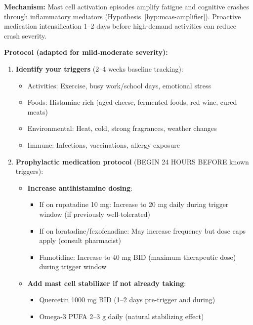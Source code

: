\begin{recommendation}
\label{rec:mcas-prophylaxis-mild-moderate}

\textbf{Mechanism:} Mast cell activation episodes amplify fatigue and cognitive crashes through inflammatory mediators (Hypothesis~\ref{hyp:mcas-amplifier}). Proactive medication intensification 1--2 days before high-demand activities can reduce crash severity.

\textbf{Protocol (adapted for mild-moderate severity):}

\begin{enumerate}
    \item \textbf{Identify your triggers} (2--4 weeks baseline tracking):
    \begin{itemize}
        \item Activities: Exercise, busy work/school days, emotional stress
        \item Foods: Histamine-rich (aged cheese, fermented foods, red wine, cured meats)
        \item Environmental: Heat, cold, strong fragrances, weather changes
        \item Immune: Infections, vaccinations, allergy exposure
    \end{itemize}

    \item \textbf{Prophylactic medication protocol} (BEGIN 24 HOURS BEFORE known triggers):
    \begin{itemize}
        \item \textbf{Increase antihistamine dosing}:
        \begin{itemize}
            \item If on rupatadine 10 mg: Increase to 20 mg daily during trigger window (if previously well-tolerated)
            \item If on loratadine/fexofenadine: May increase frequency but dose caps apply (consult pharmacist)
            \item Famotidine: Increase to 40 mg BID (maximum therapeutic dose) during trigger window
        \end{itemize}

        \item \textbf{Add mast cell stabilizer if not already taking}:
        \begin{itemize}
            \item Quercetin 1000 mg BID (1--2 days pre-trigger and during)
            \item Omega-3 PUFA 2--3 g daily (natural stabilizing effect)
        \end{itemize}


\end{itemize}
\end{enumerate}
\end{recommendation}
